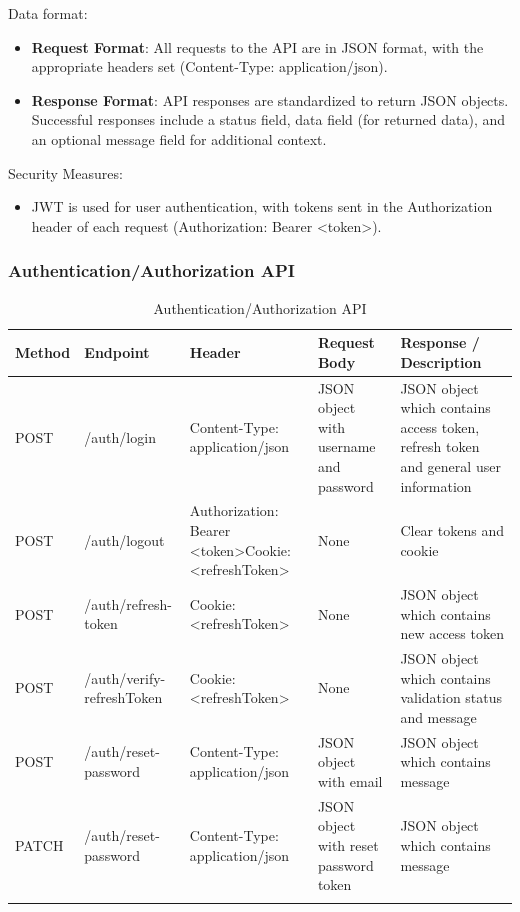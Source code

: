 	Data format:
	\begin{itemize}
		\item \textbf{Request Format}: All requests to the API are in JSON format, with the appropriate headers set (Content-Type: application/json).
		
		\item \textbf{Response Format}: API responses are standardized to return JSON objects. Successful responses include a status field, data field (for returned data), and an optional message field for additional context.
	\end{itemize}
	
	Security Measures: 
	\begin{itemize}
		\item JWT is used for user authentication, with tokens sent in the Authorization header of each request (Authorization: Bearer <token>).
	\end{itemize}

	\newpage 
	\subsubsection{Authentication/Authorization API}
	\begin{longtable}{|m{1.5cm}|m{4.8cm}|m{3.3cm}|m{3cm}|m{3.2cm}|}
		\hline
		\textbf{Method} & \textbf{Endpoint} & \textbf{Header}                                                                                                                            & \textbf{Request Body} & \textbf{Response / Description}   \\ \hline
		\endhead
		
		POST & /auth/login & Content-Type: application/json & JSON object with username and password & JSON object which contains access token, refresh token and general user information \\ \hline
		
		POST & /auth/logout & Authorization: Bearer <token>\newline Cookie: <refreshToken> & None  & Clear tokens and cookie \\ \hline
		
		POST & /auth/refresh-token & Cookie: <refreshToken>& None & JSON object which contains new access token \\ \hline
		
		POST & /auth/verify-refreshToken & Cookie: <refreshToken>& None & JSON object which contains validation status and message \\ \hline
		
		POST & /auth/reset-password &  Content-Type: application/json &  JSON object with email  &  JSON object which contains message \\ \hline
		
		PATCH & /auth/reset-password &  Content-Type: application/json &  JSON object with reset password token &  JSON object which contains message \\ \hline
		
		
		\caption{Authentication/Authorization API}
		\label{tab:auth-api}
		
	\end{longtable}
	
